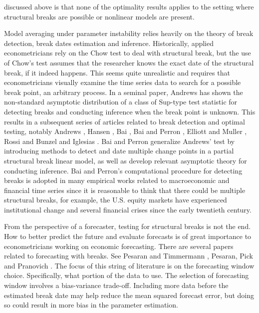 discussed above is that none of the optimality results applies to the setting where structural breaks are possible or nonlinear models are present.

Model averaging under parameter instability relies heavily on the theory of break detection, break dates estimation and inference. Historically, applied econometricians rely on the Chow test to deal with structural break, but the use of Chow's test assumes that the researcher knows the exact date of the structural break, if it indeed happens. This seems quite unrealistic and requires that econometricians visually examine the time series data to search for a possible break point, an arbitrary process. In a seminal paper, Andrews \cite{andrews93} has shown the non-standard asymptotic distribution of a class of Sup-type test statistic for detecting breaks and conducting inference when the break point is unknown. This results in a subsequent series of articles related to break detection and optimal testing, notably Andrews \cite{andrews_ploberger94} \cite{andrews2003}, Hansen \cite{hansen_JE2000}, Bai \cite{bai_ET1997} \cite{bai_JE1999}, Bai and Perron \cite{bai_perron98}, Elliott and Muller \cite{elliott_muller_RES2006}, Rossi \cite{rossi_ET2005} and Bunzel and Iglesias \cite{bunzel_iglesias}. Bai and Perron \cite{bai_perron98} generalize Andrews' test by introducing methods to detect and date multiple change points in a partial structural break linear model, as well as develop relevant asymptotic theory for conducting inference. Bai and Perron's computational procedure for detecting breaks is adopted in many empirical works related to macroeconomic and financial time series since it is reasonable to think that there could be multiple structural breaks, for example, the U.S. equity markets have experienced institutional change and several financial crises since the early twentieth century.

From the perspective of a forecaster, testing for structural breaks is not the end. How to better predict the future and evaluate forecasts is of great importance to econometricians working on economic forecasting. There are several papers related to forecasting with breaks. See Pesaran and Timmermann \cite{pesaran_timmermann_JE2007}, Pesaran, Pick and Pranovich \cite{pesaran_pick_pranovich_2011}. The focus of this string of literature is on the forecasting window choice. Specifically, what portion of the data to use. The selection of forecasting window involves a bias-variance trade-off. Including more data before the estimated break date may help reduce the mean squared forecast error, but doing so could result in more bias in the parameter estimation.

